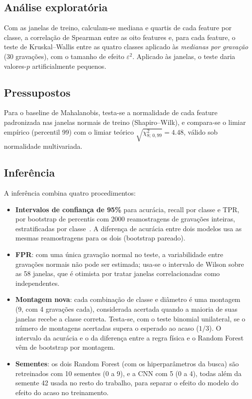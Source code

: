 \subsection{Análise exploratória}
\label{sec:met-eda}

Com as janelas de treino, calculam-se mediana e
quartis de cada feature por classe, a correlação de Spearman entre as oito
features e, para cada feature, o teste de Kruskal--Wallis entre as quatro classes
aplicado às \emph{medianas por gravação} (30 gravações), com o tamanho de efeito
$\varepsilon^2$. Aplicado às janelas, o teste daria valores-$p$ artificialmente
pequenos.

\subsection{Pressupostos}
\label{sec:met-pressupostos}

Para o baseline de Mahalanobis, testa-se a normalidade
de cada feature padronizada nas janelas normais de treino (Shapiro--Wilk), e
compara-se o limiar empírico (percentil 99) com o limiar teórico
$\sqrt{\chi^2_{8;\,0{,}99}} = \num{4.48}$, válido sob normalidade multivariada.

\subsection{Inferência}
\label{sec:met-inferencia}

A inferência combina quatro procedimentos:
\begin{itemize}
  \item \textbf{Intervalos de confiança de 95\%} para acurácia, recall por classe e
  TPR, por bootstrap de percentis com 2000 reamostragens de gravações inteiras,
  estratificadas por classe~\cite[cap.~8]{wasserman2004}. A diferença de acurácia
  entre dois modelos usa as mesmas reamostragens para os dois (bootstrap
  pareado).
  \item \textbf{FPR}: com uma única gravação normal no teste, a variabilidade
  entre gravações normais não pode ser estimada; usa-se o intervalo de Wilson
  sobre as 58 janelas, que é otimista por tratar janelas
  correlacionadas como independentes.
  \item \textbf{Montagem nova}: cada combinação de classe e diâmetro é uma montagem
  (9, com 4 gravações cada), considerada acertada quando a maioria de suas
  janelas recebe a classe correta. Testa-se, com o teste binomial unilateral, se
  o número de montagens acertadas supera o esperado ao acaso ($1/3$). O intervalo
  da acurácia e o da diferença entre a regra física e o Random Forest vêm de
  bootstrap por montagem.
  \item \textbf{Sementes}: os dois Random Forest (com os hiperparâmetros da busca)
  são retreinados com 10 sementes (0 a 9), e a CNN com 5 (0 a 4), todas além da
  semente 42 usada no resto do trabalho, para separar o efeito do modelo do
  efeito do acaso no treinamento.
\end{itemize}

